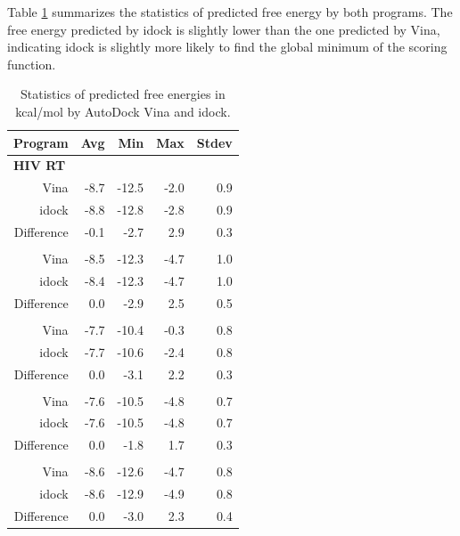 Table \ref{tab:DockingFreeEnergy} summarizes the statistics of predicted free energy by both programs. The free energy predicted by idock is slightly lower than the one predicted by Vina, indicating idock is slightly more likely to find the global minimum of the scoring function.

\begin{table}
\centering
\begin{tabular*}
{\textwidth}
{@{\extracolsep{\fill}}rrrrr}
\toprule
Program & Avg & Min & Max & Stdev\\
\midrule
\multicolumn{5}{l}{\textbf{HIV RT}}\\
Vina	        &	-8.7  &	-12.5 &	-2.0 & 0.9\\
idock	        &	-8.8  &	-12.8 & -2.8 & 0.9\\
Difference	&	-0.1  &	  -2.7 &  2.9 & 0.3\\
\noalign{\smallskip\smallskip}
\multicolumn{5}{l}{\textbf{SAHH}}\\
Vina	        &	-8.5  &	-12.3 & -4.7 & 1.0\\
idock       	&	-8.4  &	-12.3 & -4.7 & 1.0\\
Difference	&   0.0  &	  -2.9 & 2.5  & 0.5\\
\noalign{\smallskip\smallskip}
\multicolumn{5}{l}{\textbf{ADA}}\\
Vina	        &	-7.7  &	-10.4 &	-0.3 & 0.8\\
idock       	&	-7.7  &	-10.6 &	-2.4 & 0.8\\
Difference	&	 0.0  &	  -3.1 &   2.2 & 0.3\\
\noalign{\smallskip\smallskip}
\multicolumn{5}{l}{\textbf{PNP}}\\
Vina	        &	-7.6  &	-10.5 & -4.8 & 0.7\\
idock       	&	-7.6  &	-10.5 & -4.8 & 0.7\\
Difference	&	 0.0  &	  -1.8 &  1.7 & 0.3\\
\noalign{\smallskip\smallskip}
\multicolumn{5}{l}{\textbf{AdoMetDC}}\\
Vina	        &	-8.6  &	-12.6 &	-4.7  & 0.8\\
idock       	&	-8.6  &	-12.9 &	-4.9  & 0.8\\
Difference	&	 0.0  &	  -3.0 &   2.3  & 0.4\\
\bottomrule
\end{tabular*}
\caption{Statistics of predicted free energies in kcal/mol by AutoDock Vina and idock.}
\label{tab:DockingFreeEnergy}
\end{table}

